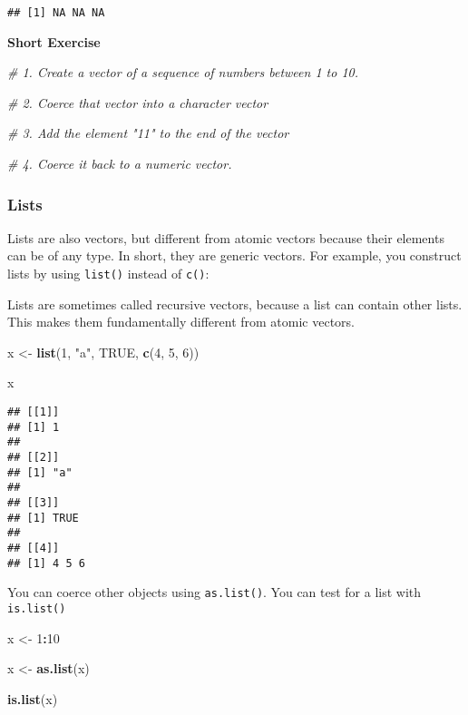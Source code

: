 \documentclass[
]{book}
\newenvironment{Shaded}{\begin{snugshade}}{\end{snugshade}}
\newcommand{\CommentTok}[1]{\textcolor[rgb]{0.56,0.35,0.01}{\textit{#1}}}
\newcommand{\DecValTok}[1]{\textcolor[rgb]{0.00,0.00,0.81}{#1}}
\newcommand{\KeywordTok}[1]{\textcolor[rgb]{0.13,0.29,0.53}{\textbf{#1}}}
\newcommand{\NormalTok}[1]{#1}
\newcommand{\OperatorTok}[1]{\textcolor[rgb]{0.81,0.36,0.00}{\textbf{#1}}}
\newcommand{\OtherTok}[1]{\textcolor[rgb]{0.56,0.35,0.01}{#1}}
\newcommand{\StringTok}[1]{\textcolor[rgb]{0.31,0.60,0.02}{#1}}
\begin{document}
\begin{verbatim}
## [1] NA NA NA
\end{verbatim}

\textbf{Short Exercise}

\begin{Shaded}
\begin{Highlighting}[]
\CommentTok{\# 1. Create a vector of a sequence of numbers between 1 to 10.}

\CommentTok{\# 2. Coerce that vector into a character vector}

\CommentTok{\# 3. Add the element "11" to the end of the vector}

\CommentTok{\# 4. Coerce it back to a numeric vector.}
\end{Highlighting}
\end{Shaded}

\hypertarget{lists}{%
\subsubsection{Lists}\label{lists}}

Lists are also vectors, but different from atomic vectors because their elements can be of any type. In short, they are generic vectors. For example, you construct lists by using \texttt{list()} instead of \texttt{c()}:

Lists are sometimes called recursive vectors, because a list can contain other lists. This makes them fundamentally different from atomic vectors.

\begin{Shaded}
\begin{Highlighting}[]
\NormalTok{x \textless{}{-}}\StringTok{ }\KeywordTok{list}\NormalTok{(}\DecValTok{1}\NormalTok{, }\StringTok{"a"}\NormalTok{, }\OtherTok{TRUE}\NormalTok{, }\KeywordTok{c}\NormalTok{(}\DecValTok{4}\NormalTok{, }\DecValTok{5}\NormalTok{, }\DecValTok{6}\NormalTok{))}

\NormalTok{x}
\end{Highlighting}
\end{Shaded}

\begin{verbatim}
## [[1]]
## [1] 1
## 
## [[2]]
## [1] "a"
## 
## [[3]]
## [1] TRUE
## 
## [[4]]
## [1] 4 5 6
\end{verbatim}

You can coerce other objects using \texttt{as.list()}. You can test for a list with \texttt{is.list()}

\begin{Shaded}
\begin{Highlighting}[]
\NormalTok{x \textless{}{-}}\StringTok{ }\DecValTok{1}\OperatorTok{:}\DecValTok{10}

\NormalTok{x \textless{}{-}}\StringTok{ }\KeywordTok{as.list}\NormalTok{(x)}

\KeywordTok{is.list}\NormalTok{(x)}
\end{Highlighting}
\end{Shaded}
\end{document}

